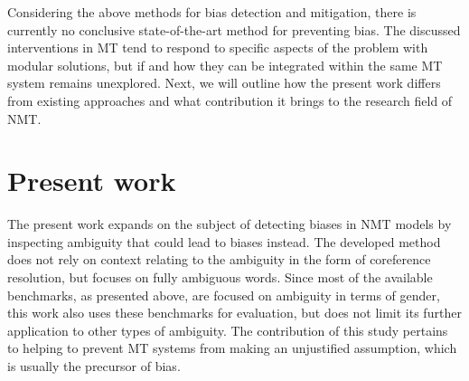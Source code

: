 Considering the above methods for bias detection and mitigation, there is currently no conclusive state-of-the-art method for preventing bias. The discussed interventions in MT tend to respond to specific aspects of the problem with modular solutions, but if and how they can be integrated within the same MT system remains unexplored. Next, we will outline how the present work differs from existing approaches and what contribution it brings to the research field of NMT.

 



\section{Present work}
\label{sec:Related_work:Present_work}

The present work expands on the subject of detecting biases in NMT models by inspecting ambiguity that could lead to biases instead. The developed method does not rely on context relating to the ambiguity in the form of coreference resolution, but focuses on fully ambiguous words. Since most of the available benchmarks, as presented above, are focused on ambiguity in terms of gender, this work also uses these benchmarks for evaluation, but does not limit its further application to other types of ambiguity. The contribution of this study pertains to helping to prevent MT systems from making an unjustified assumption, which is usually the precursor of bias.

